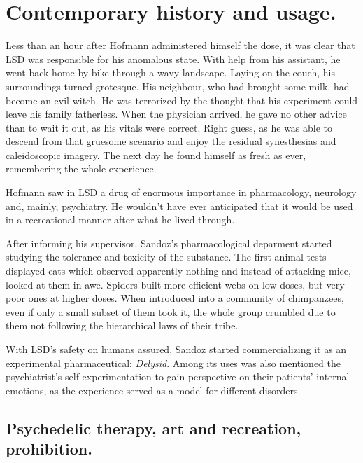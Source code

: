 \section{Contemporary history and usage.} \label{now-history}

Less than an hour after Hofmann administered himself the dose, it was clear that LSD was responsible for his anomalous state. With help from his assistant, he went back home by bike through a wavy landscape. Laying on the couch, his surroundings turned grotesque. His neighbour, who had brought some milk, had become an evil witch. He was terrorized by the thought that his experiment could leave his family fatherless. When the physician arrived, he gave no other advice than to wait it out, as his vitals were correct. Right guess, as he was able to descend from that gruesome scenario and enjoy the residual synesthesias and caleidoscopic imagery. The next day he found himself as fresh as ever, remembering the whole experience.

Hofmann saw in LSD a drug of enormous importance in pharmacology, neurology and, mainly, psychiatry. He wouldn't have ever anticipated that it would be used in a recreational manner after what he lived through.

After informing his supervisor, Sandoz's pharmacological deparment started studying the tolerance and toxicity of the substance. The first animal tests displayed cats which observed apparently nothing and instead of attacking mice, looked at them in awe. Spiders built more efficient webs on low doses, but very poor ones at higher doses. When introduced into a community of chimpanzees, even if only a small subset of them took it, the whole group crumbled due to them not following the hierarchical laws of their tribe.

With LSD's safety on humans assured, Sandoz started commercializing it as an experimental pharmaceutical: \textit{Delysid}. Among its uses was also mentioned the psychiatrist's self-experimentation to gain perspective on their patients' internal emotions, as the experience served as a model for different disorders.

\subsection{Psychedelic therapy, art and recreation, prohibition.}

